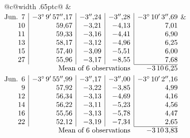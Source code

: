 \noindent\begin{tabular}{@{}c@{\hspace{.4em}\vrule width .65pt\hspace{.4em}}c@{}}
 &
 \\[.18ex]
\(\begin{array}[t]{@{}r|r|r|r|r@{}}
\text{Jun.}\enspace 7 & -3^\circ\,9'\,57''{,}17 & -3''{,}24 & -3''{,}28 & -3^\circ\,10'\,3''{,}69\\
10 & 59{,}67 & -3{,}21 & -4{,}13 & 7{,}01\\
11 & 59{,}33 & -3{,}16 & -4{,}41 & 6{,}90\\
13 & 58{,}17 & -3{,}12 & -4{,}96 & 6{,}25\\
15 & 57{,}40 & -3{,}09 & -5{,}51 & 6{,}00\\
27 & 55{,}96 & -3{,}17 & -8{,}55 & 7{,}68\\
\cline{5-5}
\multicolumn{4}{r}{\text{Mean of 6 observations}} & -3\,10\,6{,}25
\end{array}\)
&
\(\begin{array}[t]{@{}r|r|r|r|r@{}}
\text{Jun.}\enspace 6 & -3^\circ\,9'\,55''{,}99 & -3''{,}17 & -3''{,}00 & -3^\circ\,10'\,2''{,}16\\
9 & 57{,}92 & -3{,}22 & -3{,}85 & 4{,}99\\
12 & 56{,}34 & -3{,}13 & -4{,}69 & 4{,}16\\
14 & 56{,}22 & -3{,}11 & -5{,}23 & 4{,}56\\
16 & 55{,}56 & -3{,}13 & -5{,}78 & 4{,}47\\
22 & 52{,}12 & -3{,}19 & -7{,}34 & 2{,}65\\
\cline{5-5}
\multicolumn{4}{r}{\text{Mean of 6 observations}} & -3\,10\,3{,}83
\end{array}\)
\end{tabular}\par\medskip
{}
